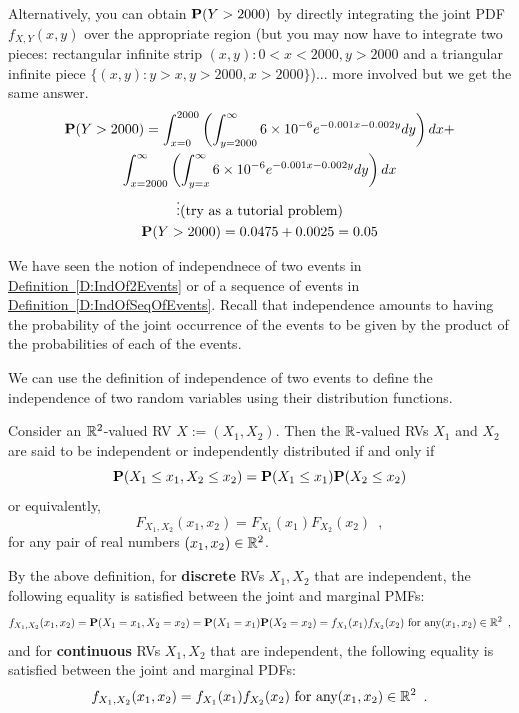 \begin{example}
{\scriptsize
Alternatively, you can obtain $\mathbf{P}(Y>2000)$ by directly integrating the joint PDF $f_{X,Y}(x,y)$ over the appropriate region (but you may now have to integrate two pieces: rectangular infinite strip ${(x,y): 0<x<2000, y>2000}$ and a triangular infinite piece $\{(x,y): y>x, y>2000, x> 2000\}$)... more involved but we get the same answer.
\begin{multline*}
\mathbf{P}(Y>2000) = \int_{x=0}^{2000} \left( \int_{y=2000}^{\infty} 6 \times 10^{-6} e^{-0.001 x - 0.002y} dy \right) dx + \\
\int_{x=2000}^{\infty} \left( \int_{y=x}^{\infty} 6 \times 10^{-6} e^{-0.001 x - 0.002y} dy \right) dx 
\\
\vdots \text{(try as a tutorial problem)} \\
\mathbf{P}(Y>2000) = 0.0475 + 0.0025 = 0.05
\end{multline*}
}
\end{example}

We have seen the notion of independnece of two events in \hyperref[D:IndOf2Events]{Definition~\ref*{D:IndOf2Events}} or of a sequence of events in \hyperref[D:IndOfSeqOfEvents]{Definition~\ref*{D:IndOfSeqOfEvents}}. 
Recall that independence amounts to having the probability of the joint occurrence of the events to be given by the product of the probabilities of each of the events.

We can use the definition of independence of two events to define the independence of two random variables using their distribution functions.

\begin{definition}\label{D:Ind2RVs}
Consider an $\mathbb{R}^2$-valued RV $X:=(X_1,X_2)$. Then the $\mathbb{R}$-valued RVs $X_1$ and $X_2$ are said to be independent or independently distributed if and only if
\[
\mathbf{P}(X_{1} \leq x_{1}, X_{2} \leq x_{2} ) = \mathbf{P}(X_{1} \leq x_{1}) \mathbf{P}(X_{2} \leq x_{2})
\]
or equivalently,
\[
F_{X_{1},X_{2}}(x_{1},x_{2}) = F_{X_{1}}(x_{1}) F_{X_{2}}(x_{2}) \enspace ,
\]
for any pair of real numbers $(x_{1},x_{2}) \in \mathbb{R}^2$.

By the above definition, for {\bf discrete} RVs $X_1,X_2$ that are independent, the following equality is satisfied between the joint and marginal PMFs:
\[
f_{X_1,X_2}(x_1,x_2) = \mathbf{P}(X_{1}= x_{1}, X_{2} = x_{2}) = \mathbf{P}(X_{1} = x_{1}) \mathbf{P}(X_{2} = x_{2}) = f_{X_1}(x_1) f_{X_2}(x_2) \text{ for any} (x_{1},x_{2}) \in \mathbb{R}^2 \enspace ,
\]
and for {\bf continuous} RVs $X_1,X_2$ that are independent, the following equality is satisfied between the joint and marginal PDFs:
\[
f_{X_1,X_2}(x_1,x_2) = f_{X_1}(x_1) f_{X_2}(x_2)  \text{ for any} (x_{1},x_{2}) \in \mathbb{R}^2 \enspace .
\] 
\end{definition}

